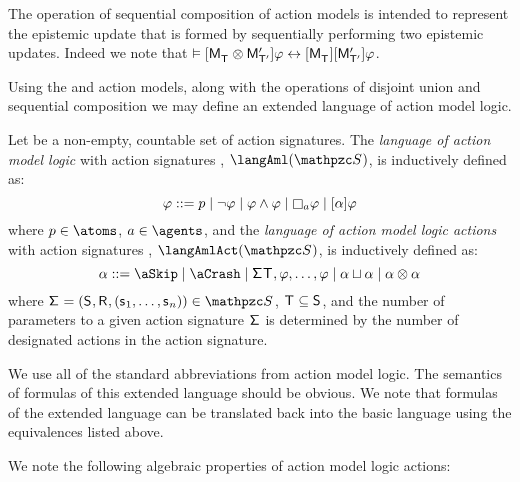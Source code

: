 The operation of sequential composition of action models is intended to represent the epistemic update that is formed by sequentially performing two epistemic updates.
Indeed we note that $\entails \actionA{\aPModel{\aStatesT} \compose \aPModelP{\aStatesTP}} \phi \iff \actionA{\aPModel{\aStatesT}} \actionA{\aPModelP{\aStatesTP}} \phi$.

Using the \aSkip{} and \aCrash{} action models, along with the operations of disjoint union and sequential composition we may define an extended language of action model logic.

\begin{definition}
Let \aSignatureFamily{} be a non-empty, countable set of action signatures.
The {\em language of action model logic} with action signatures \aSignatureFamily{}, $\langAml(\aSignatureFamily)$, is inductively defined as:
$$
\phi ::=
    \atomP \mid
    \lnot \phi \mid
    \phi \land \phi \mid
    \necessaryA \phi \mid
    \actionA{\alpha} \phi
$$
where $\atomP \in \atoms$, $\agentA \in \agents$, and the {\em language of action model logic actions} with action signatures \aSignatureFamily{}, $\langAmlAct(\aSignatureFamily)$, is inductively defined as:
$$
\alpha ::=
    \aSkip \mid
    \aCrash \mid
    \aSignature \aStatesT, \phi, \dots, \phi \mid
    \alpha \choice \alpha \mid
    \alpha \compose \alpha
$$
where $\aSignatureAndTuple \in \aSignatureFamily$, $\aStatesT \subseteq \aStates$, and the number of parameters to a given action signature $\aSignature$ is determined by the number of designated actions in the action signature.
\end{definition}

We use all of the standard abbreviations from action model logic.
The semantics of formulas of this extended language should be obvious.
We note that formulas of the extended language can be translated back into the basic language using the equivalences listed above.

We note the following algebraic properties of action model logic actions:

